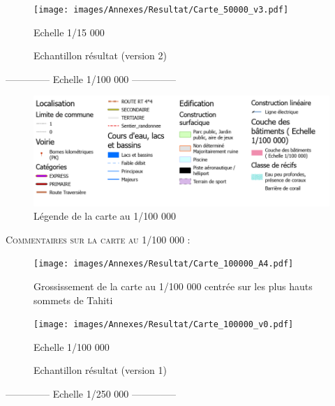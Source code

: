 \documentclass{themeensg}
\begin{document}
\begin{appendices}
\begin{figure}
\centering
\texttt{[image: images/Annexes/Resultat/Carte\_50000\_v3.pdf]}%
\caption{Echantillon résultat (version 2) }
\colorbox{blue!10}{Echelle 1/15 000}
\label{15000 v2}%
\end{figure}

\clearpage

\begin{center}
    \Large
    \colorbox{orange!10}{--------------\- Echelle 1/100 000 --------------\-}
\end{center}

\begin{figure}[!h]
\centering
\includegraphics[width=\linewidth]{images/Annexes/Resultat/legende_100.png}
\caption{Légende de la carte au 1/100 000}
\label{100000_legende}
\end{figure}

\vspace{3cm}
\textsc{Commentaires sur la carte au 1/100 000 :}\\

\begin{figure}[!h]
\centering
\texttt{[image: images/Annexes/Resultat/Carte\_100000\_A4.pdf]}
\caption{Grossissement de la carte au 1/100 000 centrée sur les plus hauts sommets de Tahiti}
\label{100000_gros}
\end{figure}

\begin{figure}
\centering
\texttt{[image: images/Annexes/Resultat/Carte\_100000\_v0.pdf]}%
\caption{Echantillon résultat (version 1) }
\colorbox{orange!10}{Echelle 1/100 000}
\label{100 000 v2}%
\end{figure}

\clearpage

\begin{center}
    \Large
    \colorbox{red!10}{--------------\- Echelle 1/250 000 --------------\-}
\end{center}


\end{appendices}
\end{document}
